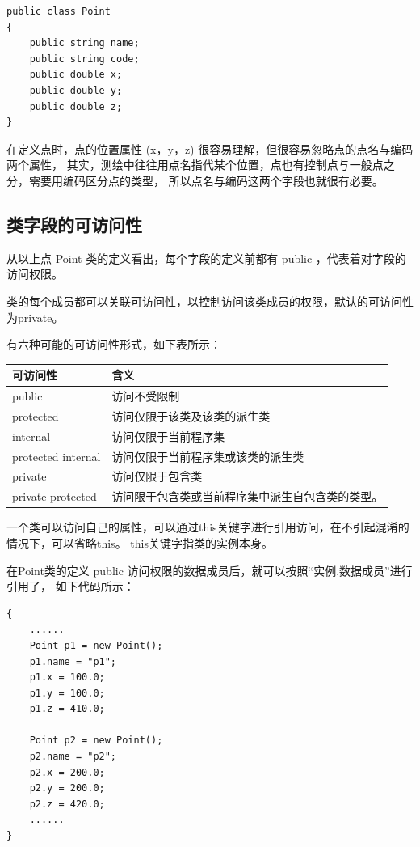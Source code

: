 \begin{lstlisting}
public class Point
{
    public string name;
    public string code;
    public double x;
    public double y;
    public double z;
}
\end{lstlisting}

在定义点时，点的位置属性 (x，y，z) 很容易理解，但很容易忽略点的点名与编码两个属性，
其实，测绘中往往用点名指代某个位置，点也有控制点与一般点之分，需要用编码区分点的类型，
所以点名与编码这两个字段也就很有必要。

\subsection{类字段的可访问性}

从以上点 Point 类的定义看出，每个字段的定义前都有 public ，代表着对字段的访问权限。

类的每个成员都可以关联可访问性，以控制访问该类成员的权限，默认的可访问性为private。

有六种可能的可访问性形式，如下表所示：

\begin{tabular}{|l|l|}
\hline
可访问性                 &   含义  \\
\hline
public                  &  访问不受限制   \\
protected               &  访问仅限于该类及该类的派生类  \\
internal                &  访问仅限于当前程序集  \\
protected internal      &  访问仅限于当前程序集或该类的派生类  \\
private                 &  访问仅限于包含类  \\
private protected       &  访问限于包含类或当前程序集中派生自包含类的类型。 \\
\hline
\end{tabular}

一个类可以访问自己的属性，可以通过this关键字进行引用访问，在不引起混淆的情况下，可以省略this。
this关键字指类的实例本身。

在Point类的定义 public 访问权限的数据成员后，就可以按照``实例.数据成员''进行引用了，
如下代码所示：

\begin{lstlisting}
{
    ......
    Point p1 = new Point();
    p1.name = "p1";
    p1.x = 100.0;
    p1.y = 100.0;
    p1.z = 410.0;

    Point p2 = new Point();
    p2.name = "p2";
    p2.x = 200.0;
    p2.y = 200.0;
    p2.z = 420.0;
    ......
}
\end{lstlisting}

